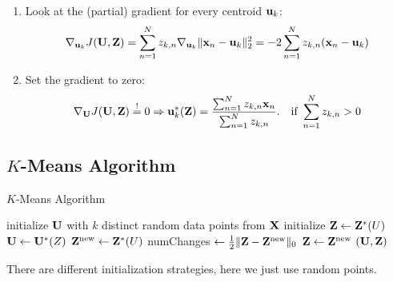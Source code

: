 \begin{enumerate}
\item Look at the (partial) gradient for every centroid \(\mathbf{u}_k\): \[
\nabla_{\mathbf{u}_k} J(\mathbf{U}, \mathbf{Z}) = \sum_{n=1}^N z_{k, n} \nabla_{\mathbf{u}_k} \| \mathbf{x}_n - \mathbf{u}_k \|_2^2 = -2 \sum_{n=1}^N z_{k, n} (\mathbf{x}_n - \mathbf{u}_k)
\]

\item Set the gradient to zero: \[
\nabla_{\mathbf{U}} J(\mathbf{U}, \mathbf{Z}) \overset{!}{=} 0 \Rightarrow \mathbf{u}_k^\ast(\mathbf{Z}) = \frac{\sum_{n=1}^N z_{k, n} \mathbf{x}_n}{\sum_{n=1}^N z_{k,n}}.\quad \text{if } \sum_{n=1}^N z_{k,n} > 0
\]
\end{enumerate}

\subsection{\(K\)-Means Algorithm}
\begin{algorithm}[H]
\caption{\(K\)-Means Algorithm}
\begin{algorithmic}[1]
\State initialize $\mathbf{U}$ with $k$ distinct random data points from $\mathbf{X}$
\State initialize $\mathbf{Z} \gets \mathbf{Z}^\ast(U)$
\Repeat
\State $\mathbf{U} \gets \mathbf{U}^\ast(Z)$
\State $\mathbf{Z}^\text{new} \gets \mathbf{Z}^\ast(U)$
\State numChanges $\gets \frac{1}{2} \|\mathbf{Z} - \mathbf{Z}^\text{new}\|_0$
\State $\mathbf{Z} \gets \mathbf{Z}^\text{new}$
\Return $(\mathbf{U}, \mathbf{Z})$
\EndProcedure
\end{algorithmic}
\end{algorithm}

There are different initialization strategies, here we just use random points.

